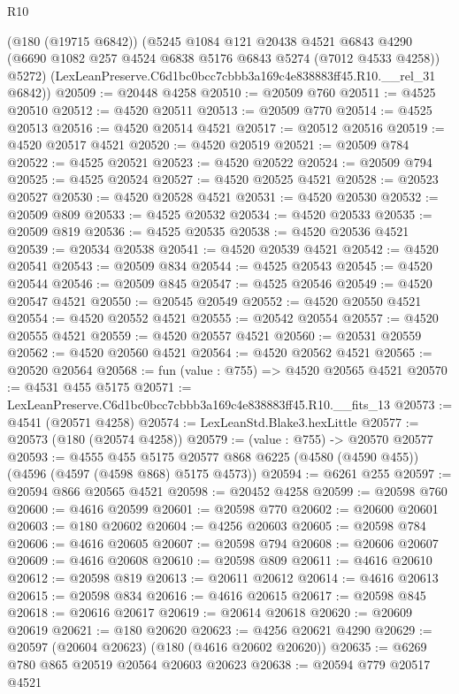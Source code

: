 \begin{lexlean}{R10}
\begin{coremodule}
      (@180 (@19715 @6842))
      (@5245
        @1084
        @121
        @20438
        @4521
        @6843
        @4290
        (@6690 @1082 @257 @4524 @6838 @5176 @6843 @5274 (@7012 @4533 @4258))
        @5272)
      (LexLeanPreserve.C6d1bc0bcc7cbbb3a169c4e838883ff45.R10.__rel_31 @6842))
@20509 := @20448 @4258
@20510 := @20509 @760
@20511 := @4525 @20510
@20512 := @4520 @20511
@20513 := @20509 @770
@20514 := @4525 @20513
@20516 := @4520 @20514 @4521
@20517 := @20512 @20516
@20519 := @4520 @20517 @4521
@20520 := @4520 @20519
@20521 := @20509 @784
@20522 := @4525 @20521
@20523 := @4520 @20522
@20524 := @20509 @794
@20525 := @4525 @20524
@20527 := @4520 @20525 @4521
@20528 := @20523 @20527
@20530 := @4520 @20528 @4521
@20531 := @4520 @20530
@20532 := @20509 @809
@20533 := @4525 @20532
@20534 := @4520 @20533
@20535 := @20509 @819
@20536 := @4525 @20535
@20538 := @4520 @20536 @4521
@20539 := @20534 @20538
@20541 := @4520 @20539 @4521
@20542 := @4520 @20541
@20543 := @20509 @834
@20544 := @4525 @20543
@20545 := @4520 @20544
@20546 := @20509 @845
@20547 := @4525 @20546
@20549 := @4520 @20547 @4521
@20550 := @20545 @20549
@20552 := @4520 @20550 @4521
@20554 := @4520 @20552 @4521
@20555 := @20542 @20554
@20557 := @4520 @20555 @4521
@20559 := @4520 @20557 @4521
@20560 := @20531 @20559
@20562 := @4520 @20560 @4521
@20564 := @4520 @20562 @4521
@20565 := @20520 @20564
@20568 := fun (value : @755) => @4520 @20565 @4521
@20570 := @4531 @455 @5175
@20571 := LexLeanPreserve.C6d1bc0bcc7cbbb3a169c4e838883ff45.R10.__fits_13
@20573 := @4541 (@20571 @4258)
@20574 := LexLeanStd.Blake3.hexLittle
@20577 := @20573 (@180 (@20574 @4258))
@20579 := (value : @755) -> @20570 @20577
@20593 := @4555
    @455
    @5175
    @20577
    @868
    @6225
    (@4580 (@4590 @455))
    (@4596 (@4597 (@4598 @868) @5175 @4573))
@20594 := @6261 @255
@20597 := @20594 @866 @20565 @4521
@20598 := @20452 @4258
@20599 := @20598 @760
@20600 := @4616 @20599
@20601 := @20598 @770
@20602 := @20600 @20601
@20603 := @180 @20602
@20604 := @4256 @20603
@20605 := @20598 @784
@20606 := @4616 @20605
@20607 := @20598 @794
@20608 := @20606 @20607
@20609 := @4616 @20608
@20610 := @20598 @809
@20611 := @4616 @20610
@20612 := @20598 @819
@20613 := @20611 @20612
@20614 := @4616 @20613
@20615 := @20598 @834
@20616 := @4616 @20615
@20617 := @20598 @845
@20618 := @20616 @20617
@20619 := @20614 @20618
@20620 := @20609 @20619
@20621 := @180 @20620
@20623 := @4256 @20621 @4290
@20629 := @20597 (@20604 @20623) (@180 (@4616 @20602 @20620))
@20635 := @6269 @780 @865 @20519 @20564 @20603 @20623
@20638 := @20594 @779 @20517 @4521

\end{coremodule}
\end{lexlean}

